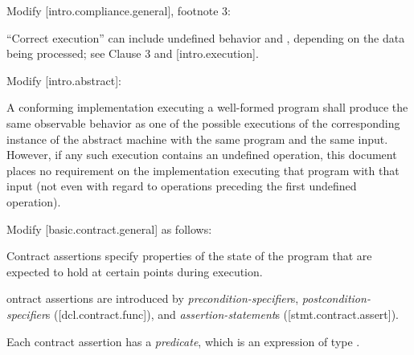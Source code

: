 Modify [intro.compliance.general], footnote 3:

\begin{adjustwidth}{0.5cm}{0.5cm}
“Correct execution” can include undefined behavior and , depending on the data being processed; see Clause 3 and [intro.execution].
\end{adjustwidth}

Modify [intro.abstract]:

\begin{adjustwidth}{0.5cm}{0.5cm}
A conforming implementation executing a well-formed program shall produce the same observable behavior as one of the possible executions of the corresponding instance of the abstract machine with the same program and the same input. However, if any such execution contains an undefined operation, this document places no requirement on the implementation executing that program with that input (not even with regard to operations preceding the first undefined operation). 


\end{adjustwidth}

Modify [basic.contract.general] as follows:
\begin{adjustwidth}{0.5cm}{0.5cm}
Contract assertions specify properties of the state of the program that are expected to hold at certain points during execution.

ontract assertions are introduced by \emph{precondition-specifier}s, \emph{postcondition-specifier}s ([dcl.contract.func]), and \emph{assertion-statement}s ([stmt.contract.assert]). 

Each contract assertion has a \emph{predicate}, which is an expression of type .  
\end{adjustwidth}

